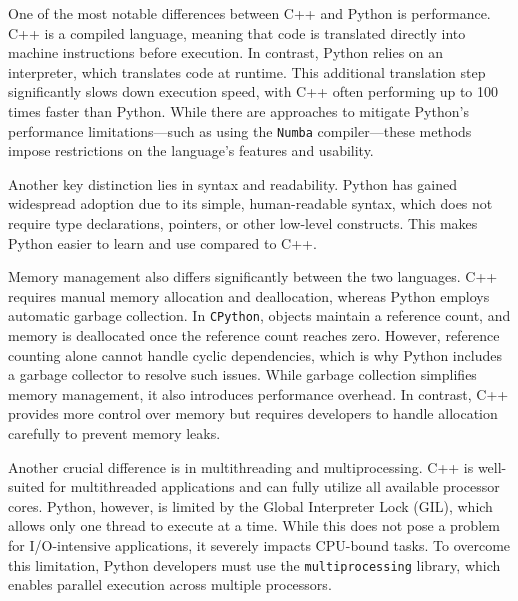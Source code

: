 One of the most notable differences between C++ and Python is performance. C++ is a compiled language, meaning that code is translated directly into machine instructions before execution. In contrast, Python relies on an interpreter, which translates code at runtime. This additional translation step significantly slows down execution speed, with C++ often performing up to 100 times faster than Python. While there are approaches to mitigate Python's performance limitations—such as using the \texttt{Numba} compiler\parencite{numba}—these methods impose restrictions on the language’s features and usability.

Another key distinction lies in syntax and readability. Python has gained widespread adoption due to its simple, human-readable syntax, which does not require type declarations, pointers, or other low-level constructs. This makes Python easier to learn and use compared to C++.

Memory management also differs significantly between the two languages. C++ requires manual memory allocation and deallocation, whereas Python employs automatic garbage collection. In \texttt{CPython}, objects maintain a reference count, and memory is deallocated once the reference count reaches zero. However, reference counting alone cannot handle cyclic dependencies, which is why Python includes a garbage collector to resolve such issues. While garbage collection simplifies memory management, it also introduces performance overhead\parencite{python-gc}. In contrast, C++ provides more control over memory but requires developers to handle allocation carefully to prevent memory leaks. \cite{sys-sage}

Another crucial difference is in multithreading and multiprocessing. C++ is well-suited for multithreaded applications and can fully utilize all available processor cores. Python, however, is limited by the Global Interpreter Lock (GIL), which allows only one thread to execute at a time. While this does not pose a problem for \ac{I/O}-intensive applications, it severely impacts CPU-bound tasks. To overcome this limitation, Python developers must use the \texttt{multiprocessing} library, which enables parallel execution across multiple processors\parencite{python-threading}.

\printbibliography
